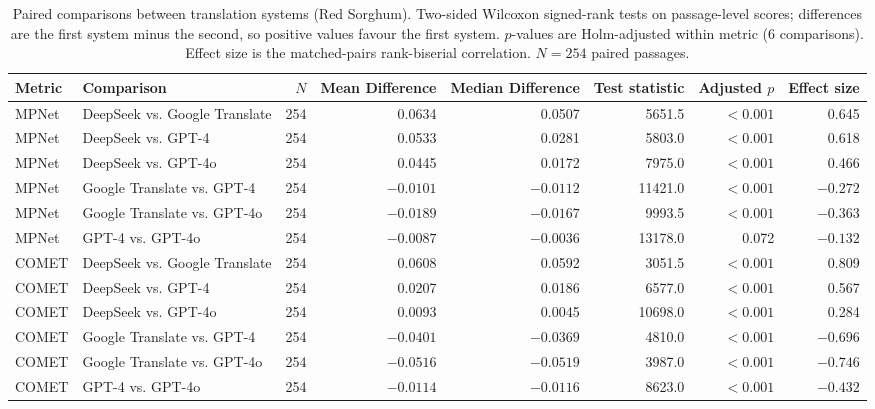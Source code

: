\begin{table}[htbp]
\centering
\caption{Paired comparisons between translation systems (Red Sorghum). Two-sided Wilcoxon signed-rank tests on passage-level scores; differences are the first system minus the second, so positive values favour the first system. $p$-values are Holm-adjusted within metric (6 comparisons). Effect size is the matched-pairs rank-biserial correlation. $N=254$ paired passages.}
\label{tab:paired_tests_red_sorghum}
\small
\begin{tabular}{llrrrrrr}
\hline
\textbf{Metric} & \textbf{Comparison} & \textbf{$N$} & \textbf{Mean Difference} & \textbf{Median Difference} & \textbf{Test statistic} & \textbf{Adjusted $p$} & \textbf{Effect size} \\
\hline
MPNet & DeepSeek vs. Google Translate & 254 & 0.0634 & 0.0507 & 5651.5 & $<0.001$ & 0.645 \\
MPNet & DeepSeek vs. GPT-4 & 254 & 0.0533 & 0.0281 & 5803.0 & $<0.001$ & 0.618 \\
MPNet & DeepSeek vs. GPT-4o & 254 & 0.0445 & 0.0172 & 7975.0 & $<0.001$ & 0.466 \\
MPNet & Google Translate vs. GPT-4 & 254 & $-0.0101$ & $-0.0112$ & 11421.0 & $<0.001$ & $-0.272$ \\
MPNet & Google Translate vs. GPT-4o & 254 & $-0.0189$ & $-0.0167$ & 9993.5 & $<0.001$ & $-0.363$ \\
MPNet & GPT-4 vs. GPT-4o & 254 & $-0.0087$ & $-0.0036$ & 13178.0 & 0.072 & $-0.132$ \\
COMET & DeepSeek vs. Google Translate & 254 & 0.0608 & 0.0592 & 3051.5 & $<0.001$ & 0.809 \\
COMET & DeepSeek vs. GPT-4 & 254 & 0.0207 & 0.0186 & 6577.0 & $<0.001$ & 0.567 \\
COMET & DeepSeek vs. GPT-4o & 254 & 0.0093 & 0.0045 & 10698.0 & $<0.001$ & 0.284 \\
COMET & Google Translate vs. GPT-4 & 254 & $-0.0401$ & $-0.0369$ & 4810.0 & $<0.001$ & $-0.696$ \\
COMET & Google Translate vs. GPT-4o & 254 & $-0.0516$ & $-0.0519$ & 3987.0 & $<0.001$ & $-0.746$ \\
COMET & GPT-4 vs. GPT-4o & 254 & $-0.0114$ & $-0.0116$ & 8623.0 & $<0.001$ & $-0.432$ \\
\hline
\end{tabular}
\end{table}
